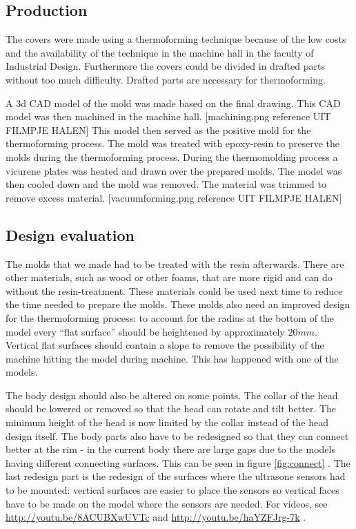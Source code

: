 \documentclass[technical_document.tex]{subfiles}
\begin{document}
\subsection{Production} 
The covers were made using a thermoforming technique because of the low costs and the availability of the technique in the machine hall in the faculty of Industrial Design. Furthermore the covers could be divided in drafted parts without too much difficulty. Drafted parts are necessary for thermoforming.

A 3d CAD model of the mold was made based on the final drawing. This CAD model was then machined in the machine hall. [machining.png reference UIT FILMPJE HALEN] This model then served as the positive mold for the thermoforming process. The mold was treated with epoxy-resin to preserve the molds during the thermoforming process. 
During the thermomolding process a vicurene plates was heated and drawn over the prepared molds. The model was then cooled down and the mold was removed. The material was trimmed to remove excess material. [vacuumforming.png reference UIT FILMPJE HALEN]

\subsection{Design evaluation}
The molds that we made had to be treated with the resin afterwards. There are other materials, such as wood or other foams, 
that are more rigid and can do without the resin-treatment. These materials could be used next time to reduce the time 
needed to prepare the molds. These molds also need an improved design for the thermoforming process: to account for the 
radius at the bottom of the model every ``flat surface'' should be heightened by approximately $20 mm$. Vertical flat surfaces should contain a slope to remove the possibility of the machine hitting the model during machine. This has happened with one of the models.

The body design should also be altered on some points. The collar of the head should be lowered or removed so that the head can rotate and tilt better. The minimum height of the head is now limited by the collar instead of the head design itself. The body parts also have to be redesigned so that they can connect better at the rim - in the current body there are large gaps due to the models having different connecting surfaces. This can be seen in figure \ref{fig:connect} . The last redesign part is the redesign of the surfaces where the ultrasone sensors had to be mounted: vertical surfaces are easier to place the sensors so vertical faces have to be made on the model where the sensors are needed. For videos, see  \url{http://youtu.be/8ACUBXwUVTc} and \url{http://youtu.be/haYZFJrg-7k} .
\end{document}
